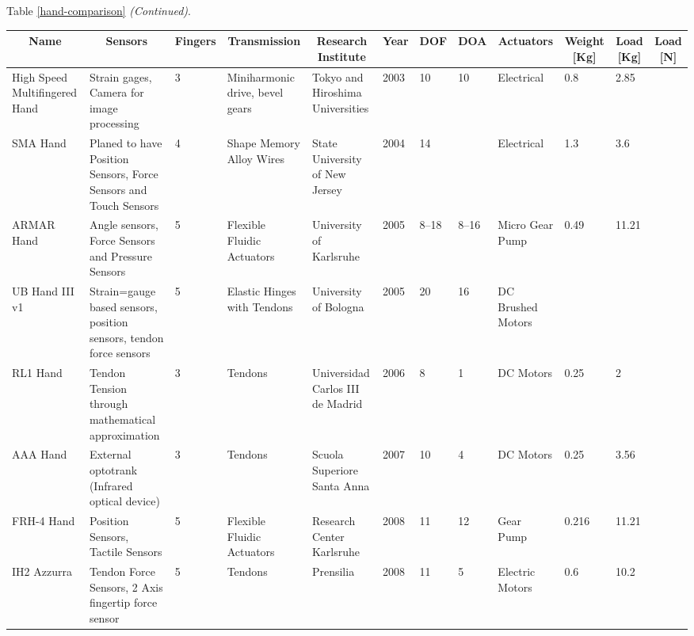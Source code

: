 \documentclass[a4paper, 10pt, conference]{ieeeconf}      %
\begin{document}
\begin{landscape}
\begin{table}[]
\begin{flushleft}
{\normalsize Table \ref{hand-comparison} \textit{(Continued)}.}\\
\end{flushleft}
\centering
\label{my-label}
\begin{tabular}{p{2cm}p{4cm}lp{2cm}p{2cm}lllp{2cm}lll}
\hline
\multicolumn{1}{c}{\textbf{Name}} & \multicolumn{1}{c}{\textbf{Sensors}} & \multicolumn{1}{c}{\textbf{Fingers}} & \multicolumn{1}{c}{\textbf{Transmission}} & \multicolumn{1}{c}{\textbf{Research Institute}} & \multicolumn{1}{c}{\textbf{Year}} & \multicolumn{1}{c}{\textbf{DOF}} & \multicolumn{1}{c}{\textbf{DOA}} & \multicolumn{1}{c}{\textbf{Actuators}} & \multicolumn{1}{c}{\textbf{Weight {[}Kg{]}}} & \multicolumn{1}{c}{\textbf{Load {[}Kg{]}}} & \multicolumn{1}{c}{\textbf{Load {[}N{]}}} \\ \hline
High Speed Multifingered Hand & Strain gages, Camera for image processing & 3 & Miniharmonic drive, bevel gears & Tokyo and Hiroshima Universities & 2003 & 10 & 10 & Electrical & 0.8 & 2.85 &  \\ \hline
SMA Hand & Planed to have Position Sensors, Force Sensors and Touch Sensors & 4 & Shape Memory Alloy Wires & State University of New Jersey & 2004 & 14 &  & Electrical & 1.3 & 3.6 &  \\ \hline
ARMAR Hand & Angle sensors, Force Sensors and Pressure Sensors & 5 & Flexible Fluidic Actuators & University of Karlsruhe & 2005 & 8–18 & 8–16 & Micro Gear Pump & 0.49 & 11.21 &  \\ \hline
UB Hand III v1 & Strain=gauge based sensors, position sensors, tendon force sensors & 5 & Elastic Hinges with Tendons & University of Bologna & 2005 & 20 & 16 & DC Brushed Motors &  &  &  \\ \hline
RL1 Hand & Tendon Tension through mathematical approximation & 3 & Tendons & Universidad Carlos III de Madrid & 2006 & 8 & 1 & DC Motors & 0.25 & 2 &  \\ \hline
AAA Hand & External optotrank (Infrared optical device) & 3 & Tendons & Scuola Superiore Santa Anna & 2007 & 10 & 4 & DC Motors & 0.25 & 3.56 &  \\ \hline
FRH-4 Hand & Position Sensors, Tactile Sensors & 5 & Flexible Fluidic Actuators & Research Center Karlsruhe & 2008 & 11 & 12 & Gear Pump & 0.216 & 11.21 &  \\ \hline
IH2 Azzurra & Tendon Force Sensors, 2 Axis fingertip force sensor & 5 & Tendons & Prensilia & 2008 & 11 & 5 & Electric Motors & 0.6 & 10.2 &  \\ \hline

\end{tabular}
\end{table}
\end{landscape}
\end{document}
